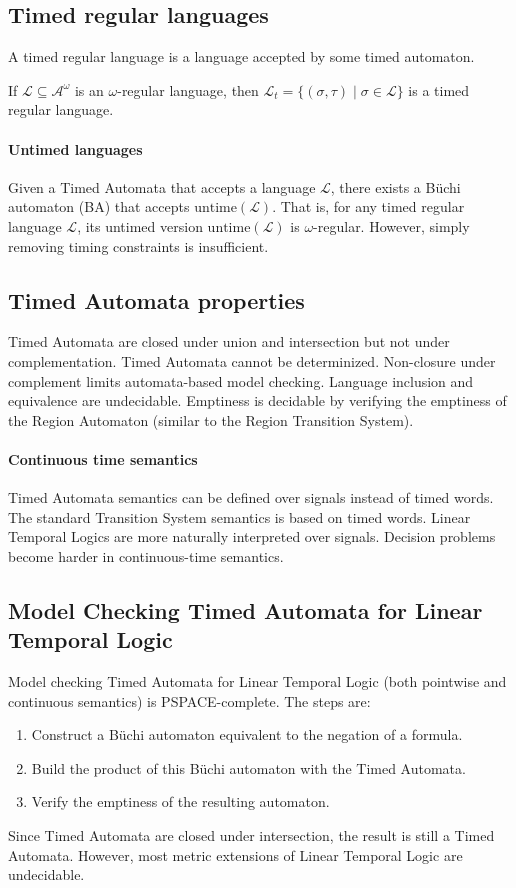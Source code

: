 \subsection{Timed regular languages}
\begin{definition}
    A timed regular language is a language accepted by some timed automaton.
\end{definition}
\noindent If $\mathcal{L} \subseteq \mathcal{A}^\omega$ is an $\omega$-regular language, then $\mathcal{L}_t = \{ (\sigma, \tau) \mid \sigma \in \mathcal{L} \}$ is a timed regular language.

\paragraph*{Untimed languages}
Given a Timed Automata that accepts a language $\mathcal{L}$, there exists a Büchi automaton (BA) that accepts $\text{untime}(\mathcal{L})$.
That is, for any timed regular language $\mathcal{L}$, its untimed version $\text{untime}(\mathcal{L})$ is $\omega$-regular.
However, simply removing timing constraints is insufficient. 


\subsection{Timed Automata properties}
Timed Automata are closed under union and intersection but not under complementation.
Timed Automata cannot be determinized.
Non-closure under complement limits automata-based model checking.
Language inclusion and equivalence are undecidable.
Emptiness is decidable by verifying the emptiness of the Region Automaton (similar to the Region Transition System).

\paragraph*{Continuous time semantics}
Timed Automata semantics can be defined over signals instead of timed words.
The standard Transition System semantics is based on timed words.
Linear Temporal Logics are more naturally interpreted over signals.
Decision problems become harder in continuous-time semantics.

\subsection{Model Checking Timed Automata for Linear Temporal Logic}
Model checking Timed Automata for Linear Temporal Logic (both pointwise and continuous semantics) is PSPACE-complete.
The steps are: 
\begin{enumerate}
    \item Construct a Büchi automaton equivalent to the negation of a formula.
    \item Build the product of this Büchi automaton with the Timed Automata.
    \item Verify the emptiness of the resulting automaton.
\end{enumerate}
\noindent Since Timed Automata are closed under intersection, the result is still a Timed Automata.
However, most metric extensions of Linear Temporal Logic are undecidable.